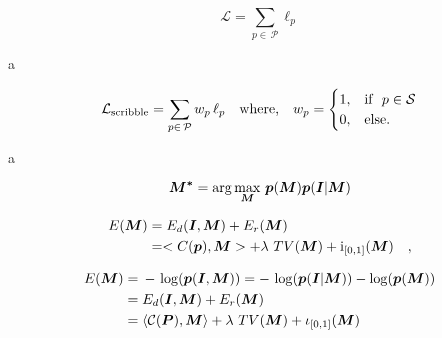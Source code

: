 \documentclass[pdftex,11pt,openright,headsepline]{book}
\begin{document}







\begin{equation*}\label{eq:nll_gen}
\mathcal{L} = \sum_{p\in\,\mathcal{P}}{\ell_{p}}
\end{equation*}

a \newline

\begin{equation*}\label{eq:nll_gen}
\mathcal{L}_{\rm{scribble}} = \sum_{p\in\,\mathcal{P}}{w_{p}\, \ell_{p}} \quad \text{where,} \quad  w_{p} = 
\begin{cases}
  1, & \text{if}\ \ p \in \mathcal{S}  \\
  0, & \text{else.}
\end{cases}
\end{equation*}



a \newline


\begin{equation*}
\boldsymbol{M^*} = \arg\max_{\boldsymbol{M}}\,{\boldsymbol{p}(\boldsymbol{M}) \boldsymbol{p}(\boldsymbol{I}|\boldsymbol{M})}
\end{equation*}

\begin{align*}
\mathop{{}E}(\boldsymbol{M}) &= \mathop{{}E_d}(\boldsymbol{I}, \boldsymbol{M}) + \mathop{{}E_r} (\boldsymbol{M}) \\
&= <\mathop{{}C}(\boldsymbol{p}), \boldsymbol{M}> + \lambda\, \mathop{{}TV}(\boldsymbol{M}) + \mathrm{i}_{[0,1]}(\boldsymbol{M}) \quad , 
\end{align*}


\begin{align*}
\mathop{{}E}(\boldsymbol{M}) &=\, - \, \log(\boldsymbol{p}(\boldsymbol{I}, \boldsymbol{M})) = -\, \log(\boldsymbol{p}(\boldsymbol{I}|\boldsymbol{M})) - \log(\boldsymbol{p}(\boldsymbol{M})) \\
&= \mathop{{}E_d}(\boldsymbol{I}, \boldsymbol{M}) + \mathop{{}E_r} (\boldsymbol{M})\\
&= \langle\mathcal{C}(\boldsymbol{P}), \boldsymbol{M}\rangle + \lambda\, \mathop{{}TV}(\boldsymbol{M}) + \iota_{[0,1]}(\boldsymbol{M})
\end{align*}
\end{document}
